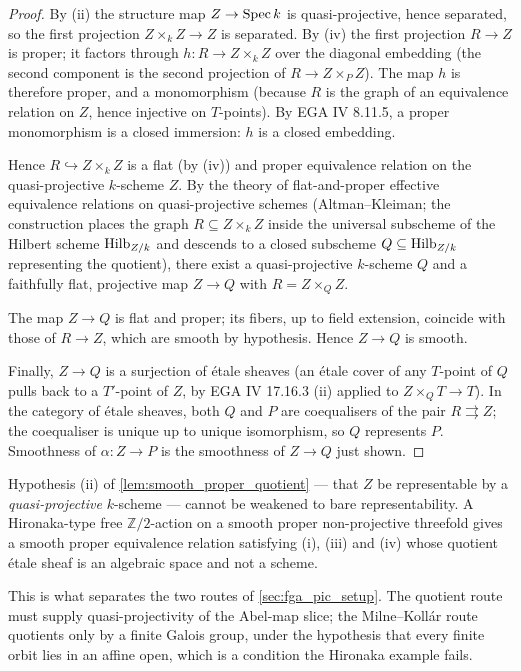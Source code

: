 \begin{proof}
  By (ii) the structure map \(Z \to \operatorname{Spec} k\) is quasi-projective, hence
  separated, so the first projection \(Z \times_k Z \to Z\) is separated.
  By (iv) the first projection \(R \to Z\) is proper; it factors through
  \(h : R \to Z \times_k Z\) over the diagonal embedding (the second
  component is the second projection of \(R \to Z \times_P Z\)). The map
  \(h\) is therefore proper, and a monomorphism (because \(R\) is the graph
  of an equivalence relation on \(Z\), hence injective on \(T\)-points).
  By EGA IV 8.11.5, a proper monomorphism is a closed immersion: \(h\) is a
  closed embedding.

  Hence \(R \hookrightarrow Z \times_k Z\) is a flat (by (iv)) and proper
  equivalence relation on the quasi-projective \(k\)-scheme \(Z\). By the
  theory of flat-and-proper effective equivalence relations on
  quasi-projective schemes (Altman--Kleiman; the construction places
  the graph \(R \subseteq Z \times_k Z\) inside the universal subscheme of
  the Hilbert scheme \(\operatorname{Hilb}_{Z/k}\) and descends to a closed subscheme
  \(Q \subseteq \operatorname{Hilb}_{Z/k}\) representing the quotient), there exist a
  quasi-projective \(k\)-scheme \(Q\) and a faithfully flat, projective map
  \(Z \to Q\) with \(R = Z \times_Q Z\).

  The map \(Z \to Q\) is flat and proper; its fibers, up to field
  extension, coincide with those of \(R \to Z\), which are smooth by
  hypothesis. Hence \(Z \to Q\) is smooth.

  Finally, \(Z \to Q\) is a surjection of \'etale sheaves (an \'etale
  cover of any \(T\)-point of \(Q\) pulls back to a \(T'\)-point of \(Z\), by
  EGA IV 17.16.3 (ii) applied to \(Z \times_Q T \to T\)). In the category
  of \'etale sheaves, both \(Q\) and \(P\) are coequalisers of the pair
  \(R \rightrightarrows Z\); the coequaliser is unique up to unique
  isomorphism, so \(Q\) represents \(P\). Smoothness of \(\alpha : Z \to P\)
  is the smoothness of \(Z \to Q\) just shown.
\end{proof}

\begin{remark}
  \label{rem:smooth_proper_quotient_hypothesis}
  Hypothesis (ii) of \cref{lem:smooth_proper_quotient} --- that \(Z\) be
  representable by a \emph{quasi-projective} \(k\)-scheme --- cannot be weakened
  to bare representability. A Hironaka-type free \(\mathbb{Z}/2\)-action on a
  smooth proper non-projective threefold gives a smooth proper equivalence
  relation satisfying (i), (iii) and (iv) whose quotient \'etale sheaf is an
  algebraic space and not a scheme.

  This is what separates the two routes of \cref{sec:fga_pic_setup}. The
  quotient route must supply quasi-projectivity of the Abel-map slice; the
  Milne--Koll\'ar route quotients only by a finite Galois group, under the
  hypothesis that every finite orbit lies in an affine open, which is a
  condition the Hironaka example fails.
\end{remark}

